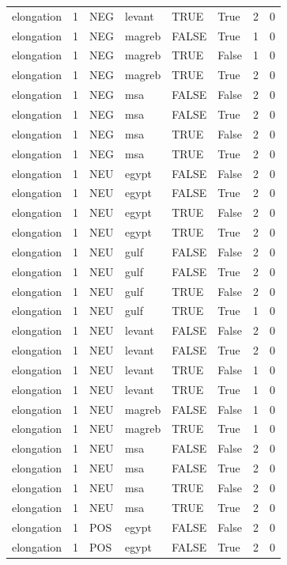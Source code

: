 \begin{tabular}{llllllrr}
elongation & 1 & NEG & levant & TRUE & True & 2 & 0 \\
elongation & 1 & NEG & magreb & FALSE & True & 1 & 0 \\
elongation & 1 & NEG & magreb & TRUE & False & 1 & 0 \\
elongation & 1 & NEG & magreb & TRUE & True & 2 & 0 \\
elongation & 1 & NEG & msa & FALSE & False & 2 & 0 \\
elongation & 1 & NEG & msa & FALSE & True & 2 & 0 \\
elongation & 1 & NEG & msa & TRUE & False & 2 & 0 \\
elongation & 1 & NEG & msa & TRUE & True & 2 & 0 \\
elongation & 1 & NEU & egypt & FALSE & False & 2 & 0 \\
elongation & 1 & NEU & egypt & FALSE & True & 2 & 0 \\
elongation & 1 & NEU & egypt & TRUE & False & 2 & 0 \\
elongation & 1 & NEU & egypt & TRUE & True & 2 & 0 \\
elongation & 1 & NEU & gulf & FALSE & False & 2 & 0 \\
elongation & 1 & NEU & gulf & FALSE & True & 2 & 0 \\
elongation & 1 & NEU & gulf & TRUE & False & 2 & 0 \\
elongation & 1 & NEU & gulf & TRUE & True & 1 & 0 \\
elongation & 1 & NEU & levant & FALSE & False & 2 & 0 \\
elongation & 1 & NEU & levant & FALSE & True & 2 & 0 \\
elongation & 1 & NEU & levant & TRUE & False & 1 & 0 \\
elongation & 1 & NEU & levant & TRUE & True & 1 & 0 \\
elongation & 1 & NEU & magreb & FALSE & False & 1 & 0 \\
elongation & 1 & NEU & magreb & TRUE & True & 1 & 0 \\
elongation & 1 & NEU & msa & FALSE & False & 2 & 0 \\
elongation & 1 & NEU & msa & FALSE & True & 2 & 0 \\
elongation & 1 & NEU & msa & TRUE & False & 2 & 0 \\
elongation & 1 & NEU & msa & TRUE & True & 2 & 0 \\
elongation & 1 & POS & egypt & FALSE & False & 2 & 0 \\
elongation & 1 & POS & egypt & FALSE & True & 2 & 0 \\

\end{tabular}
